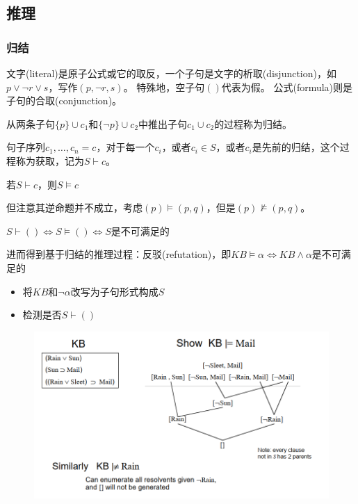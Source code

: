 \subsection{推理}
\subsubsection{归结}
\begin{definition}[子句(clause)]
文字(literal)是原子公式或它的取反，一个子句是文字的析取(disjunction)，如$p\lor\lnot r\lor s$，写作$(p,\lnot r,s)$。
特殊地，空子句$()$代表为假。
公式(formula)则是子句的合取(conjunction)。
\end{definition}

\begin{definition}[归结(resolution)]
从两条子句$\{p\}\cup c_1$和$\{\lnot p\}\cup c_2$中推出子句$c_1\cup c_2$的过程称为归结。
\end{definition}
\begin{definition}[获取(derivation)]
句子序列$c_1,\ldots,c_n=c$，对于每一个$c_i$，或者$c_i\in S$，或者$c_i$是先前的归结，这个过程称为获取，记为$S\vdash c$。
\end{definition}
\begin{theorem}
若$S\vdash c$，则$S\models c$
\end{theorem}
但注意其逆命题并不成立，考虑$(p)\models(p,q)$，但是$(p)\nvDash(p,q)$。

\begin{theorem}
$S\vdash()\iff S\models()\iff S$是不可满足的
\end{theorem}

进而得到基于归结的推理过程：反驳(refutation)，即$KB\models\alpha\iff KB\land\alpha$是不可满足的
\begin{itemize}
	\item 将$KB$和$\lnot\alpha$改写为子句形式构成$S$
	\item 检测是否$S\vdash()$
\end{itemize}
\begin{figure}[H]
\centering
\includegraphics[width=0.8\linewidth]{fig/refutation.png}
\end{figure}

